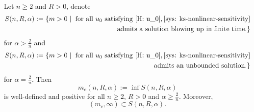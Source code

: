 \begin{frame}
\begin{corollary}\label{critical mass corollary}
	Let $n\geqslant2$ and $R>0$, denote
	\begin{equation}\nonumber
		\begin{aligned}
			S(n, R, \alpha) := \{ m > 0 \mid \text{ for all } u_0 \text{ satisfying } \eqref{H: u_0},
			\eqref{sys: ks-nonlinear-sensitivity} \\
			\text{ admits a solution blowing up in finite time.}\}
		\end{aligned}
	\end{equation}
for $\alpha > \frac2n$ and
\begin{equation}\nonumber
	\begin{aligned}
		S(n, R, \alpha) := \{ m > 0 \mid \text{ for all } u_0 \text{ satisfying } \eqref{H: u_0},
		\eqref{sys: ks-nonlinear-sensitivity} \\
		\text{ admits an unbounded solution.}\}
	\end{aligned}
\end{equation}
for $\alpha=\frac2n$. Then
 $$m_c(n, R, \alpha) := \inf S(n, R, \alpha)$$ is well-defined and positive for all $n\geqslant2$, $R>0$ and $\alpha\geqslant\frac2n$. Moreover,
$$(m_c,\infty)\subset S(n, R, \alpha).$$
\end{corollary}
\end{frame}


